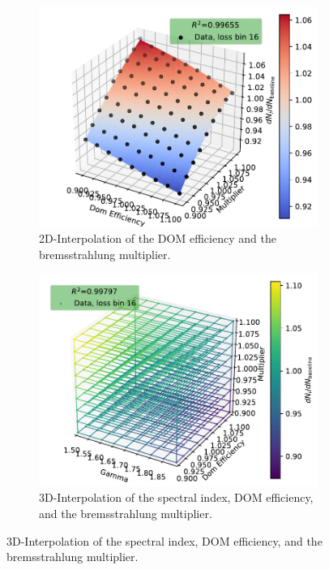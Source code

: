 \begin{figure}
    \centering
    \begin{subfigure}{0.47\textwidth}
        \centering
        \includegraphics[width=\textwidth]{./plots/results_study/interpol_energy_bin_3_2d.pdf}
        \caption{2D-Interpolation of the DOM efficiency and the bremsstrahlung multiplier.}
        \label{fig:study_interpol_2d_show}
    \end{subfigure}
    \hfill
    \begin{subfigure}{0.47\textwidth}
        \centering
        \includegraphics[width=\textwidth]{./plots/results_study/interpol_energy_bin_3_3d.pdf}
        \caption{3D-Interpolation of the spectral index, DOM efficiency, and the bremsstrahlung multiplier.}

\end{subfigure}
\end{figure}
